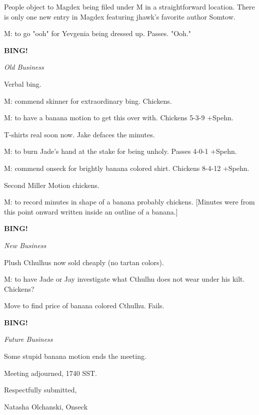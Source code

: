 \documentclass[12pt]{article}
\newcommand{\bing}{{\bf BING!} }
\newcommand{\goto}[1]{\bing \vskip 12pt \centerline{{\em{#1}}}}
\begin{document}
People object to Magdex being filed under M in a straightforward location. There is only one new entry in Magdex featuring jhawk's favorite author Somtow.

M: to go "ooh" for Yevgenia being dressed up. Passes. "Ooh."

\goto{Old Business}

Verbal bing.

M: commend skinner for extraordinary bing. Chickens.

M: to have a banana motion to get this over with. Chickens 5-3-9 +Spehn.

T-shirts real soon now. Jake defaces the minutes.

M: to burn Jade's hand at the stake for being unholy. Passes 4-0-1 +Spehn.

M: commend onseck for brightly banana colored shirt. Chickens 8-4-12 +Spehn.

Second Miller Motion chickens.

M: to record minutes in shape of a banana probably chickens. [Minutes were from this point onward written inside an outline of a banana.]

\goto{New Business}

Plush Cthulhus now sold cheaply (no tartan colors).

M: to have Jade or Jay investigate what Cthulhu does not wear under his kilt. Chickens?

Move to find price of banana colored Cthulhu. Fails.

\goto{Future Business}

Some stupid banana motion ends the meeting.

\vspace{12pt}

\noindent
Meeting adjourned, 1740 SST.

\vspace{18pt}

\centerline{Respectfully submitted,}
\centerline{Natasha Olchanski, Onseck}
\end{document}
